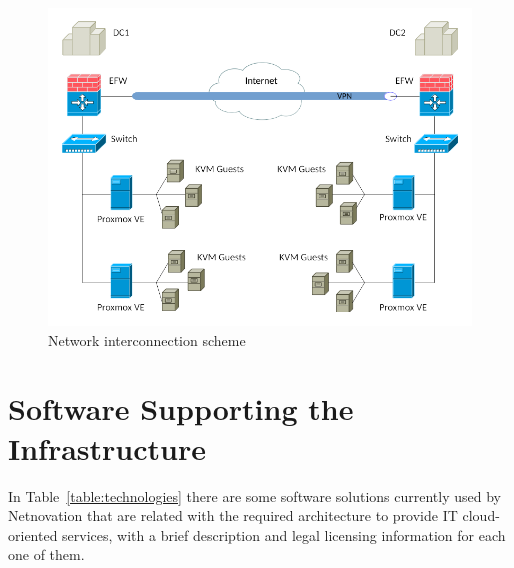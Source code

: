 \documentclass[a4paper, 12pt]{book}
\begin{document}
\begin{figure}[H]
  \centering
  \includegraphics[scale=0.50]{network_scheme.png}
  \caption[Network interconnection scheme]{Network interconnection scheme}
  \label{fig:network}
\end{figure}

\section{Software Supporting the Infrastructure}
\label{sec:software}

In Table~\ref{table:technologies} there are some software solutions currently used by Netnovation that are related with the required architecture to provide IT cloud-oriented services, with a brief description and legal licensing information for each one of them.
\end{document}
